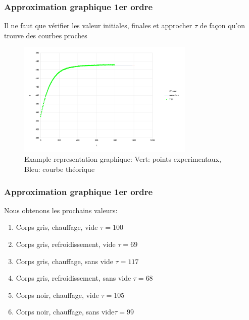 \documentclass{beamer}
\begin{document}
\begin{frame}
\frametitle{Approximation graphique 1er ordre}

Il ne faut que vérifier les valeur initiales, finales et approcher $\tau$ de façon qu'on trouve des courbes proches

\begin{figure}
\includegraphics[width=0.75\textwidth]{Fig/t1-100-t2-82.png}
\caption{Example representation graphique: Vert: points experimentaux, Bleu: courbe théorique}
\end{figure}

\end{frame}





\begin{frame}
\frametitle{Approximation graphique 1er ordre}

Nous obtenons les prochains valeurs:
\begin{enumerate}
	\item{{\color{gray7}Corps gris}{\color{gray4}, {\color{red}chauffage}, vide} \hfill $\tau = 100$\hspace{4em} \newline}
	\item{{\color{gray7}Corps gris}{\color{gray4}, {\color{blue5}refroidissement}, vide} \hfill $\tau = 69$\hspace{4em} \newline}
	\item{{\color{gray7}Corps gris}{\color{gray4}, {\color{red}chauffage}, sans vide} \hfill $\tau = 117$\hspace{4em} \newline}
	\item{{\color{gray7}Corps gris}{\color{gray4}, {\color{blue5}refroidissement}, sans vide} \hfill $\tau = 68$\hspace{4em} \newline}
	\item{{\color{black}Corps noir}{\color{gray4}, {\color{red}chauffage}, vide} \hfill $\tau = 105$\hspace{4em} \newline}
	\item{{\color{black}Corps noir}{\color{gray4}, {\color{red}chauffage}, sans vide}\hfill $\tau = 99$\hspace{4em} \newline}
\end{enumerate}
\end{frame}
\end{document}
